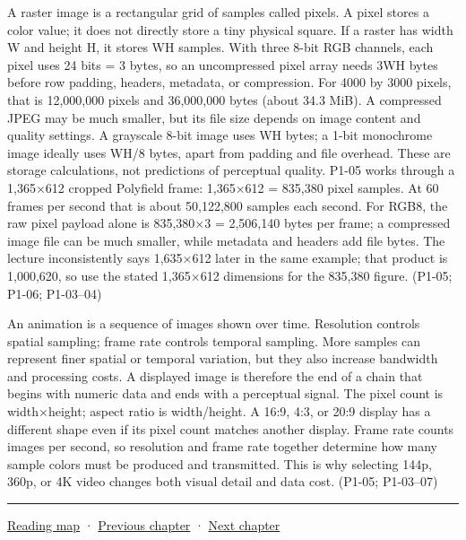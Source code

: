 A raster image is a rectangular grid of samples called pixels. A pixel stores a color value; it does not directly store a tiny physical square. If a raster has width W and height H, it stores WH samples. With three 8-bit RGB channels, each pixel uses 24 bits = 3 bytes, so an uncompressed pixel array needs 3WH bytes before row padding, headers, metadata, or compression. For 4000 by 3000 pixels, that is 12,000,000 pixels and 36,000,000 bytes (about 34.3 MiB). A compressed JPEG may be much smaller, but its file size depends on image content and quality settings. A grayscale 8-bit image uses WH bytes; a 1-bit monochrome image ideally uses WH/8 bytes, apart from padding and file overhead. These are storage calculations, not predictions of perceptual quality. P1-05 works through a 1,365×612 cropped Polyfield frame: 1,365×612 = 835,380 pixel samples. At 60 frames per second that is about 50,122,800 samples each second. For RGB8, the raw pixel payload alone is 835,380×3 = 2,506,140 bytes per frame; a compressed image file can be much smaller, while metadata and headers add file bytes. The lecture inconsistently says 1,635×612 later in the same example; that product is 1,000,620, so use the stated 1,365×612 dimensions for the 835,380 figure. (P1-05; P1-06; P1-03--04)

An animation is a sequence of images shown over time. Resolution controls spatial sampling; frame rate controls temporal sampling. More samples can represent finer spatial or temporal variation, but they also increase bandwidth and processing costs. A displayed image is therefore the end of a chain that begins with numeric data and ends with a perceptual signal. The pixel count is width×height; aspect ratio is width/height. A 16:9, 4:3, or 20:9 display has a different shape even if its pixel count matches another display. Frame rate counts images per second, so resolution and frame rate together determine how many sample colors must be produced and transmitted. This is why selecting 144p, 360p, or 4K video changes both visual detail and data cost. (P1-05; P1-03--07)

\begin{center}\rule{0.5\linewidth}{0.5pt}\end{center}

\hyperref[volume-reading-map]{Reading map} · \hyperref[03-visual-computing-i-ch002-surfaces-topology-and-parameterization]{Previous chapter} · \hyperref[03-visual-computing-i-ch004-sampling-filtering-and-reconstruction]{Next chapter}
